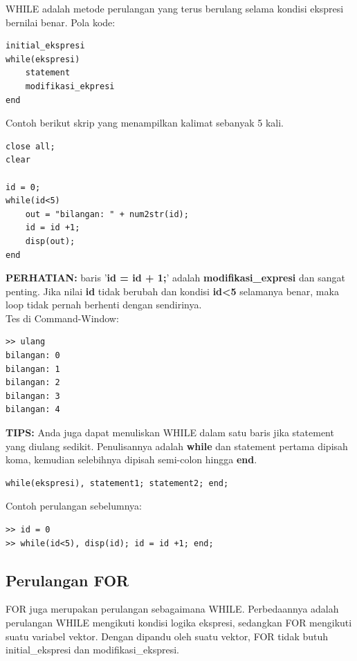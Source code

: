 \documentclass[12pt]{book}
\begin{document}
	WHILE adalah metode perulangan yang terus berulang selama kondisi ekspresi bernilai benar.
	Pola kode:
	\begin{verbatim}
initial_ekspresi
while(ekspresi)
	statement
	modifikasi_ekpresi
end
	\end{verbatim}

	Contoh berikut skrip yang menampilkan kalimat sebanyak 5 kali.
	\begin{verbatim}
close all;
clear

id = 0;
while(id<5)
	out = "bilangan: " + num2str(id);
	id = id +1;
	disp(out);
end
	\end{verbatim}

	\textbf{PERHATIAN:} baris '\textbf{id = id + 1;}' adalah \textbf{modifikasi\_expresi} dan sangat penting.
	Jika nilai \textbf{id} tidak berubah dan kondisi \textbf{id<5} selamanya benar, maka loop tidak pernah berhenti dengan sendirinya.\\

	Tes di Command-Window:
	\begin{verbatim}
>> ulang
bilangan: 0
bilangan: 1
bilangan: 2
bilangan: 3
bilangan: 4
	\end{verbatim}

	\textbf{TIPS:} Anda juga dapat menuliskan WHILE dalam satu baris jika statement yang diulang sedikit.
	Penulisannya adalah \textbf{while} dan statement pertama dipisah koma, kemudian selebihnya dipisah semi-colon hingga \textbf{end}.
	\begin{verbatim}
while(ekspresi), statement1; statement2; end;
	\end{verbatim}

	Contoh perulangan sebelumnya:
	\begin{verbatim}
>> id = 0
>> while(id<5), disp(id); id = id +1; end;
	\end{verbatim}

	\subsection{Perulangan FOR}

	FOR juga merupakan perulangan sebagaimana WHILE.
	Perbedaannya adalah perulangan WHILE mengikuti kondisi logika ekspresi,
	sedangkan FOR mengikuti suatu variabel vektor.
	Dengan dipandu oleh suatu vektor, FOR tidak butuh initial\_ekspresi dan modifikasi\_ekspresi.
\end{document}
